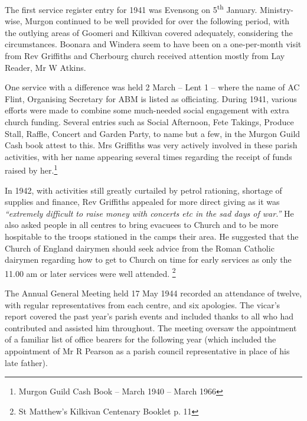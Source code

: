 The first service register entry for 1941 was Evensong on 5\textsuperscript{th} January. Ministry-wise, Murgon continued to be well provided for over the following period, with the outlying areas of Goomeri and Kilkivan covered adequately, considering the circumstances. Boonara and Windera seem to have been on a one-per-month visit from Rev Griffiths and Cherbourg church received attention mostly from Lay Reader, Mr W Atkins.



One service with a difference was held 2 March -- Lent 1 -- where the name of AC Flint, Organising Secretary for ABM is listed as officiating. During 1941, various efforts were made to combine some much-needed social engagement with extra church funding. Several entries such as Social Afternoon, Fete Takings, Produce Stall, Raffle, Concert and Garden Party, to name but a few, in the Murgon Guild Cash book attest to this. Mrs Griffiths was very actively involved in these parish activities, with her name appearing several times regarding the receipt of funds raised by her.\footnote{Murgon Guild Cash Book -- March 1940 -- March 1966}


In 1942, with activities still greatly curtailed by petrol rationing, shortage of supplies and finance, Rev Griffiths appealed for more direct giving as it was \emph{``extremely difficult to raise money with concerts etc in the sad days of war.''} He also asked people in all centres to bring evacuees to Church and to be more hospitable to the troops stationed in the camps their area. He suggested that the Church of England dairymen should seek advice from the Roman Catholic dairymen regarding how to get to Church on time for early services as only the 11.00 am or later services were well attended. \footnote{St Matthew's Kilkivan Centenary Booklet p. 11}


The Annual General Meeting held 17 May 1944 recorded an attendance of twelve, with regular representatives from each centre, and six apologies. The vicar's report covered the past year's parish events and included thanks to all who had contributed and assisted him throughout. The meeting oversaw the appointment of a familiar list of office bearers for the following year (which included the appointment of Mr R Pearson as a parish council representative in place of his late father).



